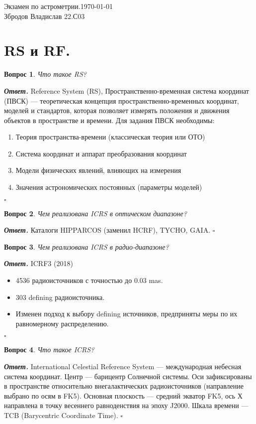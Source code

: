 \documentclass[12pt]{article}
\newtheorem{problem}{Вопрос}
\newenvironment{solution}[1][\it{Ответ}]{\textbf{#1. } }{$\square$}
\begin{document}
	\noindent Экзамен по астрометрии.\hfill \today \\
	Збродов Владислав 22.С03
	
	\hrulefill
	

\section{RS и RF.}
	\begin{problem}
		Что такое RS?
		
		
	\end{problem}

	\begin{solution}
	Reference System (RS), Пространственно-временная система координат (ПВСК) — теоретическая
	концепция пространственно-временных координат, моделей и стандартов, которая позволяет измерять положения и движения объектов в пространстве и времени.
	Для задания ПВСК необходимы:
	\begin{enumerate}
	\item Теория пространства-времени (классическая теория или ОТО)
	\item Система координат и аппарат преобразования координат
	 \item Модели физических явлений, влияющих на измерения
	\item Значения астрономических постоянных (параметры моделей)
			\end{enumerate}
	\end{solution} 
	
	\begin{problem}
	Чем реализована ICRS в оптическом диапазоне?
	\end{problem}
	\begin{solution}
Каталоги HIPPARCOS (заменил HCRF), TYCHO, GAIA.
	\end{solution}
	
	
	\begin{problem}
		Чем реализована ICRS в радио-диапазоне?
	\end{problem}
	\begin{solution}
		ICRF3 (2018)
		\begin{itemize}
						\item 4536 радиоисточников с точностью до 0.03 mas.
			\item 303 defining радиоисточника.
			\item Изменен подход к выбору defining источников, предприняты меры по их равномерному распределению.
		\end{itemize}
	\end{solution}
		\begin{problem}
		Что такое ICRS?
	\end{problem}
	\begin{solution}
		International Celestial Reference System — международная небесная система координат. Центр — барицентр Солнечной системы. Оси зафиксированы в пространстве относительно внегалактических радиоисточников (направление выбрано по осям в FK5). Основная плоскость — средний экватор FK5, ось Х направлена в точку весеннего равноденствия на эпоху J2000. Шкала времени — TCB (Barycentric Coordinate Time).
	\end{solution}
	
\end{document}
